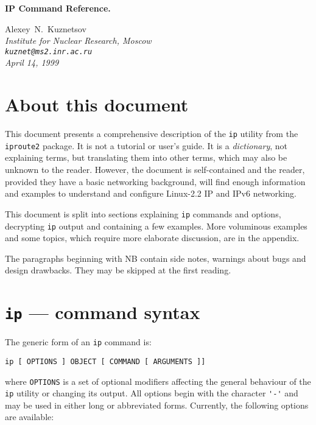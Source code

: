 \def\TITLE{IP Command Reference}

\begin{center}
\Large\bf IP Command Reference.
\end{center}


\begin{center}
{ \large Alexey~N.~Kuznetsov } \\
\em Institute for Nuclear Research, Moscow \\
\verb|kuznet@ms2.inr.ac.ru| \\
\rm April 14, 1999
\end{center}

\vspace{5mm}

\tableofcontents

\newpage

\section{About this document}

This document presents a comprehensive description of the \verb|ip| utility
from the \verb|iproute2| package. It is not a tutorial or user's guide.
It is a {\em dictionary\/}, not explaining terms,
but translating them into other terms, which may also be unknown to the reader.
However, the document is self-contained and the reader, provided they have a
basic networking background, will find enough information
and examples to understand and configure Linux-2.2 IP and IPv6
networking.

This document is split into sections explaining \verb|ip| commands
and options, decrypting \verb|ip| output and containing a few examples.
More voluminous examples and some topics, which require more elaborate
discussion, are in the appendix.

The paragraphs beginning with NB contain side notes, warnings about
bugs and design drawbacks. They may be skipped at the first reading.

\section{{\tt ip} --- command syntax}

The generic form of an \verb|ip| command is:
\begin{verbatim}
ip [ OPTIONS ] OBJECT [ COMMAND [ ARGUMENTS ]]
\end{verbatim}
where \verb|OPTIONS| is a set of optional modifiers affecting the
general behaviour of the \verb|ip| utility or changing its output. All options
begin with the character \verb|'-'| and may be used in either long or abbreviated 
forms. Currently, the following options are available:

